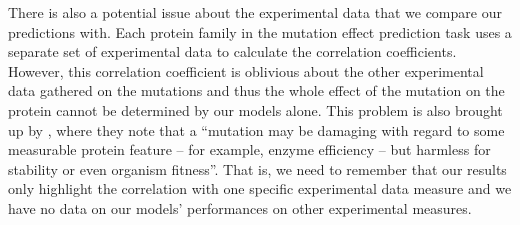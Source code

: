 There is also a potential issue about the experimental data that we compare our predictions with. Each protein family in the mutation effect prediction task uses a separate set of experimental data to calculate the correlation coefficients. However, this correlation coefficient is oblivious about the other experimental data gathered on the mutations and thus the whole effect of the mutation on the protein cannot be determined by our models alone. This problem is also brought up by \textcite{riesselman2018deep}, where they note that a ``mutation may be damaging with regard to some measurable protein feature -- for example, enzyme efficiency -- but harmless for stability or even organism fitness''. That is, we need to remember that our results only highlight the correlation with one specific experimental data measure and we have no data on our models' performances on other experimental measures.




